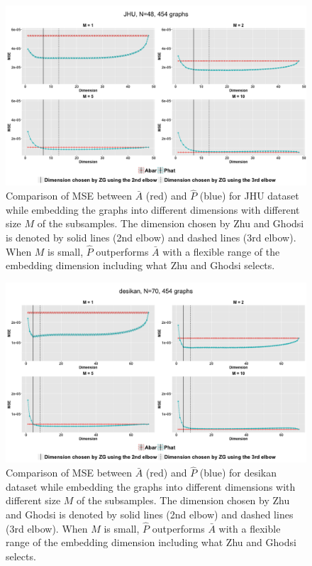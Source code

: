 \begin{figure}[!htb]
\centering
\includegraphics[width=14cm]{JHU.png}
\caption{Comparison of MSE between $\bar{A}$ (red) and $\hat{P}$ (blue) for JHU dataset while embedding the graphs into different dimensions with different size $M$ of the subsamples. The dimension chosen by Zhu and Ghodsi is denoted by solid lines (2nd elbow) and dashed lines (3rd elbow). When $M$ is small, $\hat{P}$ outperforms $\bar{A}$ with a flexible range of the embedding dimension including what Zhu and Ghodsi selects.}
\label{fig:JHU}
\end{figure}

\begin{figure}[!htb]
\centering
\includegraphics[width=14cm]{desikan.png}
\caption{Comparison of MSE between $\bar{A}$ (red) and $\hat{P}$ (blue) for desikan dataset while embedding the graphs into different dimensions with different size $M$ of the subsamples. The dimension chosen by Zhu and Ghodsi is denoted by solid lines (2nd elbow) and dashed lines (3rd elbow). When $M$ is small, $\hat{P}$ outperforms $\bar{A}$ with a flexible range of the embedding dimension including what Zhu and Ghodsi selects.}
\label{fig:desikan}
\end{figure}

